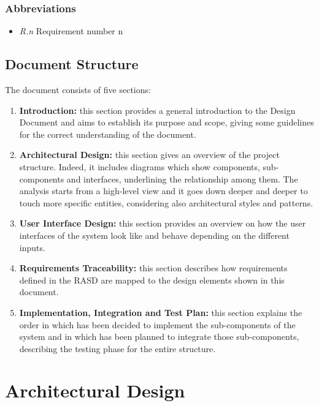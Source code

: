 \documentclass[a4paper]{article}
\begin{document}
\subsubsection{Abbreviations}
\begin{itemize}
    \item \textit{R.n} Requirement number n
\end{itemize}
\clearpage    


\subsection{Document Structure}
The document consists of five sections:
\begin{enumerate}[label*=\bf{\arabic*.}]
    \item \textbf{Introduction:} this section provides a general introduction to the Design Document and aims to establish its purpose and scope, giving some guidelines for the correct understanding of the document.
    \item \textbf{Architectural Design:} this section gives an overview of the project structure. Indeed, it includes diagrams which show components, sub-components and interfaces, underlining the relationship among them. The analysis starts from a high-level view and it goes down deeper and deeper to touch more specific entities, considering also architectural styles and patterns.  
    \item \textbf{User Interface Design:} this section provides an overview on how the user interfaces of the system look like and behave depending on the different inputs.
    \item \textbf{Requirements Traceability:} this section describes how requirements defined in the RASD are mapped to the design elements shown in this document.
    \item \textbf{Implementation, Integration and Test Plan:} this section explains the order in which has been decided to implement the sub-components of the system and in which has been planned to integrate those sub-components, describing the testing phase for the entire structure.
\end{enumerate}
\clearpage

\section{Architectural Design}
\vspace{.5cm}
\end{document}

